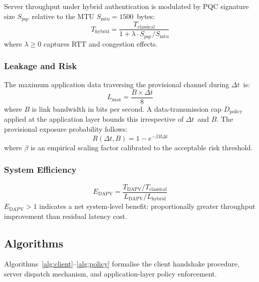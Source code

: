 \documentclass[preprint,10pt,3p]{elsarticle}
\newcommand{\Dt}{\ensuremath{\Delta t}}
\begin{document}
Server throughput under hybrid authentication is modulated by PQC signature
size $S_\text{pqc}$ relative to the MTU $S_\text{mtu} = 1500$~bytes:
\begin{equation}
  T_\text{hybrid} = \frac{T_\text{classical}}
    {1 + \lambda \cdot S_\text{pqc} / S_\text{mtu}}
\end{equation}
where $\lambda \geq 0$ captures RTT and congestion effects.

\subsubsection{Leakage and Risk}

The maximum application data traversing the provisional channel during \Dt\ is:
\begin{equation}
  L_\text{max} = \frac{B \times \Dt}{8}
  \label{eq:leakage}
\end{equation}
where $B$ is link bandwidth in bits per second.  A data-transmission cap
$D_\text{policy}$ applied at the application layer bounds this irrespective of
\Dt\ and $B$.  The provisional exposure probability follows:
\begin{equation}
  R(\Dt, B) = 1 - e^{-\beta B \Dt}
  \label{eq:risk}
\end{equation}
where $\beta$ is an empirical scaling factor calibrated to the acceptable
risk threshold.

\subsubsection{System Efficiency}

\begin{equation}
  E_\text{DAPV} = \frac{T_\text{DAPV} / T_\text{classical}}
                       {L_\text{DAPV} / L_\text{hybrid}}
  \label{eq:efficiency}
\end{equation}
$E_\text{DAPV} > 1$ indicates a net system-level benefit: proportionally greater
throughput improvement than residual latency cost.

\subsection{Algorithms}
\label{sec:algorithms}

Algorithms~\ref{alg:client}--\ref{alg:policy} formalise the client handshake
procedure, server dispatch mechanism, and application-layer policy enforcement.
\end{document}
